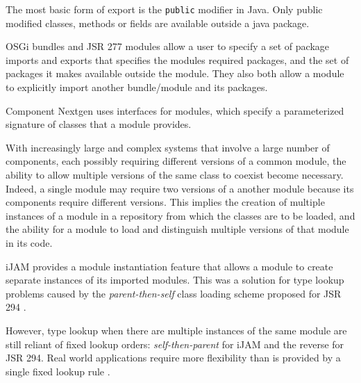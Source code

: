 The most basic form of export is the {\tt public} modifier in Java. Only
public modified classes, methods or fields are available outside a java package.

OSGi bundles and JSR 277 modules allow a user to specify a set of package imports 
and exports that specifies the modules required packages, and the set of packages 
it makes available outside the module. They also both allow a module
to explicitly import another bundle/module and its packages.

Component Nextgen \cite{componentnextgen} uses interfaces for modules, which
specify a parameterized signature of classes that a module provides.

With increasingly large and complex systems that involve a large number of components,
each possibly requiring different versions of a common module,
the ability to allow multiple versions of the same class to coexist become necessary.
Indeed, a single module may require two versions of a another module because its
components require different versions. This implies the creation of multiple instances 
of a module in a repository from which the classes are to be loaded, and the ability
for a module to load and distinguish multiple versions of that module in its code.

iJAM \cite{iJAM} provides a module instantiation feature that allows a module to create
separate instances of its imported modules. This was a solution for type lookup
problems caused by the {\it parent-then-self} class loading scheme proposed for
JSR 294 \cite{JSR294}.

However, type lookup when there are multiple instances of the same module are still
reliant of fixed lookup orders: {\it self-then-parent} for iJAM and the reverse for JSR 294.
Real world applications require more flexibility than is provided by a single fixed
lookup rule \cite{iJAMComments}.